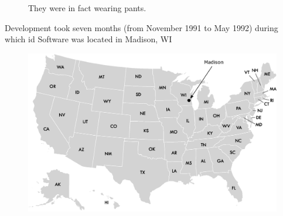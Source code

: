 \documentclass[book.tex]{subfiles}
\begin{document}
\begin{figure}[H]
\centering
\caption{They were in fact wearing pants.}
\label{fig:id_team_1993}
\end{figure}


Development took seven months (from November 1991 to May 1992) during which id Software was located in Madison, WI
\begin{figure}[H]
\centering
 \includegraphics[width=\textwidth]{imgs/drawings/map/usa-id-software.eps}
 \end{figure}
\end{document}

